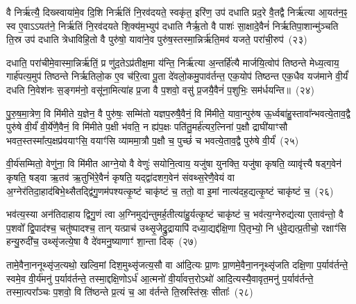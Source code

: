 वै निर्\mbox{}ऋ॑त्यै॒ दिख्स्वाया॑मे॒व दि॒शि निर्\mbox{}ऋ॑तिं नि॒रव॑दयते॒ स्वकृ॑त॒ इरि॑ण॒ उप॑ दधाति प्रद॒रे वै॒तद्वै निर्\mbox{}ऋ॑त्या आ॒यत॑न॒ꣴ॒ स्व ए॒वा\-ऽऽ\-यत॑ने॒ निर्\mbox{}ऋ॑तिं नि॒रव॑दयते शि॒क्य॑म॒भ्युप॑ दधाति नैर्\mbox{}ऋ॒तो वै पाशः॑ सा॒क्षादे॒वैनं॑ निर्\mbox{}ऋतिपा॒शान्मु॑ञ्चति ति॒स्र उप॑ दधाति त्रेधाविहि॒तो वै पुरु॑षो॒ यावा॑ने॒व पुरु॑ष॒स्तस्मा॒न्निर्\mbox{}ऋ॑ति॒मव॑ यजते॒ परा॑ची॒रुप॑~(२३)\ip

दधाति॒ परा॑चीमे॒वास्मा॒न्निर्\mbox{}ऋ॑तिं॒ प्र णु॑द॒ते\-ऽप्र॑तीक्ष॒मा य॑न्ति॒ निर्\mbox{}ऋ॑त्या अ॒न्तर्\mbox{}हि॑त्यै मार्जयि॒त्वोप॑ तिष्ठन्ते मेध्य॒त्वाय॒ गार्\mbox{}ह॑पत्य॒मुप॑ तिष्ठन्ते निर्\mbox{}ऋतिलो॒क ए॒व च॑रि॒त्वा पू॒ता दे॑वलो॒कमु॒पाव॑र्तन्त॒ एक॒योप॑ तिष्ठन्त एक॒धैव यज॑माने वी॒र्यं॑ दधति नि॒वेश॑नः स॒ङ्गम॑नो॒ वसू॑ना॒मित्या॑ह प्र॒जा वै प॒शवो॒ वसु॑ प्र॒जयै॒वैनं॑ प॒शुभिः॒ सम॑र्धयन्ति॥~(२४)\ip

{\anuvakamend[{ऋ॒तुभि॑रे॒षा परा॑ची॒रुपा॒ष्टाच॑त्वारिꣳशच्च}]}

पु॒रु॒ष॒मा॒त्रेण॒ वि मि॑मीते य॒ज्ञेन॒ वै पुरु॑षः॒ सम्मि॑तो यज्ञप॒रुषै॒वैनं॒ वि मि॑मीते॒ यावा॒न्पुरु॑ष ऊ॒र्ध्वबा॑हु॒स्तावा᳚न्भव\-त्ये॒ताव॒द्वै पुरु॑षे वी॒र्यं॑ वी॒र्ये॑णै॒वैनं॒ वि मि॑मीते प॒क्षी भ॑वति॒ न ह्य॑प॒क्षः पति॑तु॒मर्\mbox{}ह॑त्यर॒त्निना॑ प॒क्षौ द्राघी॑याꣳसौ भवत॒स्तस्मा᳚त्प॒क्षप्र॑वयाꣳसि॒ वयाꣳ॑सि व्याममा॒त्रौ प॒क्षौ च॒ पुच्छं॑ च भवत्ये॒ताव॒द्वै पुरु॑षे वी॒र्यं॑~(२५)\ip

वी॒र्य॑सम्मितो॒ वेणु॑ना॒ वि मि॑मीत आग्ने॒यो वै वेणुः॑ सयोनि॒त्वाय॒ यजु॑षा युनक्ति॒ यजु॑षा कृषति॒ व्यावृ॑त्त्यै षड्ग॒वेन॑ कृषति॒ षड्वा ऋ॒तव॑ ऋ॒तुभि॑रे॒वैनं॑ कृषति॒ यद्द्वा॑दशग॒वेन॑ संवथ्स॒रेणै॒वेयं वा अ॒ग्नेर॑तिदा॒हाद॑बिभे॒थ्सैतद्द्वि॑गु॒णम॑पश्यत्कृ॒ष्टं चाकृ॑ष्टं च॒ ततो॒ वा इ॒मां नात्य॑दह॒द्यत्कृ॒ष्टं चाकृ॑ष्टं च॒~(२६)\ip

भव॑त्य॒स्या अन॑तिदाहाय द्विगु॒णं त्वा अ॒ग्निमुद्य॑न्तुमर्\mbox{}ह॒तीत्या॑हु॒र्यत्कृ॒ष्टं चाकृ॑ष्टं च॒ भव॑त्य॒ग्नेरुद्य॑त्या ए॒ताव॑न्तो॒ वै प॒शवो᳚ द्वि॒पाद॑श्च॒ चतु॑ष्पादश्च॒ तान् यत्प्राच॑ उथ्सृ॒जेद्रु॒द्रायापि॑ दध्या॒द्यद्द॑क्षि॒णा पि॒तृभ्यो॒ नि धु॑वे॒द्यत्प्र॒तीचो॒ रक्षाꣳ॑सि हन्यु॒रुदी॑च॒ उथ्सृ॑जत्ये॒षा वै दे॑वमनु॒ष्याणाꣳ॑ शा॒न्ता दिक्~(२७)\ip

तामे॒वैना॒ननूथ्सृ॑ज॒त्यथो॒ खल्वि॒मां दिश॒मुथ्सृ॑जत्य॒सौ वा आ॑दि॒त्यः प्रा॒णः प्रा॒णमे॒वैना॒ननूथ्सृ॑जति दक्षि॒णा प॒र्याव॑र्तन्ते॒ स्वमे॒व वी॒र्य॑मनु॑ प॒र्याव॑र्तन्ते॒ तस्मा॒द्दक्षि॒णो\-ऽर्ध॑ आ॒त्मनो॑ वी॒र्या॑वत्त॒रो\-ऽथो॑ आदि॒त्यस्यै॒वावृत॒मनु॑ प॒र्याव॑र्तन्ते॒ तस्मा॒त्परा᳚ञ्चः प॒शवो॒ वि ति॑ष्ठन्ते प्र॒त्यं च॒ आ व॑र्तन्ते ति॒स्रस्ति॑स्रः॒ सीताः᳚~(२८)\ip

